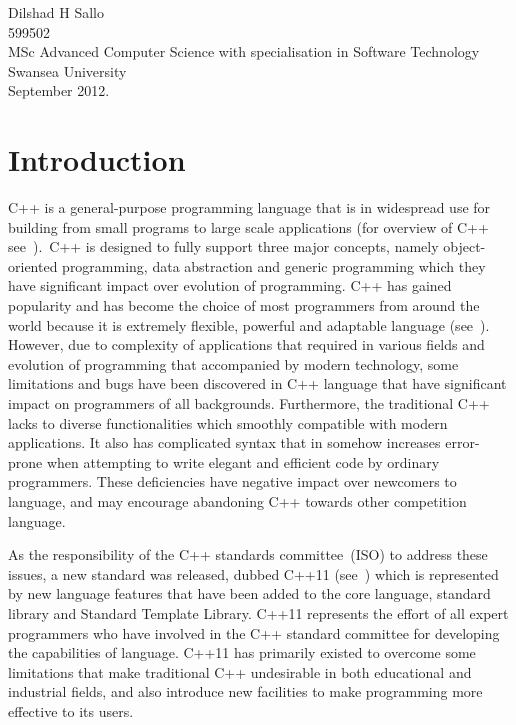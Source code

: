 \documentclass[11pt]{report}
\begin{document}
\begin{flushright}
Dilshad H Sallo\\
599502\\
MSc Advanced Computer Science with specialisation in Software Technology\\
Swansea University\\
September 2012.
\end{flushright}

\tableofcontents

\chapter{Introduction}
\label{cha:intro}
C++ is a general-purpose programming language that is in widespread use for building from small programs to large scale applications (for overview of C++ see~\cite{Stroustrup:2012:Cpp11}).~C++ is designed to fully support three major concepts, namely object-oriented programming, data abstraction and generic programming which they have significant impact over evolution of programming. C++ has gained popularity and has become the choice of most programmers from around the world because it is extremely flexible, powerful and adaptable language (see~\cite{Stroustrup:2012:Cpp11}). However, due to complexity of applications that required in various fields and evolution of programming that accompanied by modern technology, some limitations and bugs have been discovered in C++ language that have significant impact on programmers of all backgrounds. Furthermore, the traditional C++ lacks to diverse functionalities which smoothly compatible with modern applications. It also has complicated syntax that in somehow increases error-prone when attempting to write elegant and efficient code by ordinary programmers. These deficiencies have negative impact over newcomers to language, and may encourage abandoning C++ towards other competition language.

As the responsibility of the C++ standards committee~(ISO) to address these issues, a new standard was released, dubbed C++11 (see~\cite{Stroustrup:2012:Cpp11}) which is represented by new language features that have been added to the core language, standard library and Standard Template Library. C++11 represents the effort of all expert programmers who have involved in the C++ standard committee for developing the capabilities of language. C++11 has primarily existed to overcome some limitations that make traditional C++ undesirable in both educational and industrial fields, and also introduce new facilities to make programming more effective to its users.
\end{document}

